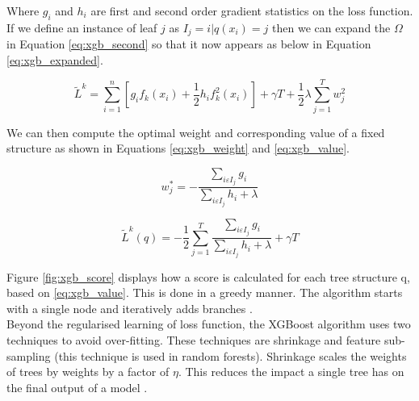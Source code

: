 \vspace{10pt}

Where $g_i$ and $h_i$ are first and second order gradient statistics on the loss function. If we define an instance of leaf $j$ as $I_j = {i|q(x_i) = j}$ then we can expand the $\Omega$ in Equation \ref{eq:xgb_second} so that it now appears as below in Equation \ref{eq:xgb_expanded}. 

\begin{equation} \label{eq:xgb_expanded}
\tilde{L}^{k} = \sum_{i=1}^{n}[g_i f_k(x_i) + \dfrac{1}{2} h_i f^{2}_{k}(x_i)] + \gamma T + \dfrac{1}{2} \lambda \sum_{j=1}^{T} w^{2}_{j}
\end{equation}

\vspace{10pt}

We can then compute the optimal weight and corresponding value of a fixed structure as shown in Equations \ref{eq:xgb_weight} and \ref{eq:xgb_value}. 

\vspace{10pt}

\begin{equation} \label{eq:xgb_weight}
w^{*}_{j} = - \dfrac{\sum_{i \varepsilon I_{j}} g_i}{\sum_{i \varepsilon I_{j}} h_i + \lambda}
\end{equation}

\vspace{10pt}

\begin{equation} \label{eq:xgb_value}
\tilde{L}^{k}(q) = - \dfrac{1}{2} \sum_{j=1}^{T} \dfrac{\sum_{i \varepsilon I_{j}} g_i}{\sum_{i \varepsilon I_{j}} h_i + \lambda} + \gamma T
\end{equation}

\vspace{10pt}

Figure \ref{fig:xgb_score} displays how a score is calculated for each tree structure q, based on \ref{eq:xgb_value}. This is done in a greedy manner. The algorithm starts with a single node and iteratively adds branches \parencite{XGBoost}.\\

Beyond the regularised learning of loss function, the XGBoost algorithm uses two techniques to avoid over-fitting. These techniques are shrinkage and feature sub-sampling (this technique is used in random forests). Shrinkage scales the weights of trees by weights by a factor of $\eta$. This reduces the impact a single tree has on the final output of a model \parencite{Shrinkage}. 

